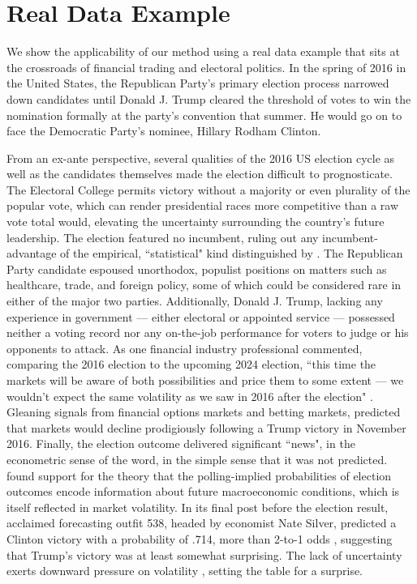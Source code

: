 \documentclass[11pt,3p,review,authoryear]{elsarticle}
\theoremstyle{definition}
\begin{document}
\clearpage 

\section{Real Data Example}\label{Real Data Example}

We show the applicability of our method using a real data example that sits at the crossroads of financial trading and electoral politics.  In the spring of 2016 in the United States, the Republican Party's primary election process narrowed down candidates until Donald J. Trump cleared the threshold of votes to win the nomination formally at the party's convention that summer.  He would go on to face the Democratic Party's nominee, Hillary Rodham Clinton.   

From an ex-ante perspective, several qualities of the 2016 US election cycle as well as the candidates themselves made the election difficult to prognosticate.  The Electoral College permits victory without a majority or even plurality of the popular vote, which can render presidential races more competitive than a raw vote total would, elevating the uncertainty surrounding the country's future leadership.  The election featured no incumbent, ruling out any incumbent-advantage of the empirical, ``statistical" kind distinguished by \citet{mayhew2008incumbency}.  The Republican Party candidate espoused unorthodox, populist positions on matters such as healthcare, trade, and foreign policy, some of which could be considered rare in either of the major two parties.  Additionally, Donald J. Trump, lacking any experience in government --- either electoral or appointed service --- possessed neither a voting record nor any on-the-job performance for voters to judge or his opponents to attack. As one financial industry professional commented, comparing the 2016 election to the upcoming 2024 election, ``this time the markets will be aware of both possibilities and price them to some extent — we wouldn’t expect the same volatility as we saw in 2016 after the election" \citep{News_2024}. Gleaning signals from financial options markets and betting markets, \citet{wolfers2016financial} predicted that markets would decline prodigiously following a Trump victory in November 2016.  Finally, the election outcome delivered significant ``news", in the econometric sense of the word, in the simple sense that it was not predicted.  \citet{goodell2013us} found support for the theory that the polling-implied probabilities of election outcomes encode information about future macroeconomic conditions, which is itself reflected in market volatility.  In its final post before the election result, acclaimed forecasting outfit 538, headed by economist Nate Silver, predicted a Clinton victory with a probability of .714, more than 2-to-1 odds \citep{Silver_2016}, suggesting that Trump's victory was at least somewhat surprising.  The lack of uncertainty exerts downward pressure on volatility \citep{li2006presidential,bowes2018stock}, setting the table for a surprise.
\end{document}
